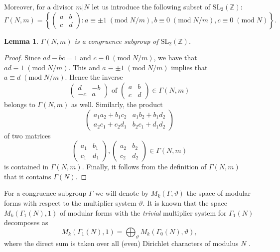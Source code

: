 \documentclass[11pt,a4paper]{amsart}
\newtheorem{lemma}[theorem]{Lemma}
\theoremstyle{definition}
\newcommand{\SZ}{\mathbb{Z}}                    %
\begin{document}
Moreover, for a divisor $m|N$ let us introduce the following subset of $\mathrm{SL_2}(\SZ)$:
\[  \Gamma(N,m) = \left\{ \begin{pmatrix} a & b \\ c & d \end{pmatrix}: a \equiv \pm 1 \;(\mathrm{mod}\;N/m), b \equiv 0 \;(\mathrm{mod}\;N/m), c \equiv 0 \;(\mathrm{mod}\;N) \right\}. \]
\begin{lemma} $\Gamma(N,m)$ is a congruence subgroup of $\mathrm{SL_2}(\SZ)$.
\end{lemma}
\begin{proof}
Since $ad-bc=1$ and $c\equiv 0  \;(\mathrm{mod}\;N/m)$, we have that $ad\equiv 1  \;(\mathrm{mod}\;N/m)$. This and $a \equiv \pm 1 \;(\mathrm{mod}\;N/m)$ implies that $a\equiv d  \;(\mathrm{mod}\;N/m)$. Hence the inverse
\[\begin{pmatrix} d & -b \\ -c & a \end{pmatrix} \textrm{ of } \begin{pmatrix} a & b \\ c & d \end{pmatrix} \in \Gamma(N,m)\]
belongs to $\Gamma(N,m)$ as well. Similarly, the product
\[ 
\begin{pmatrix} a_1a_2+b_1c_2 & a_1b_2+b_1d_2 \\ a_2c_1+c_2d_1 & b_2c_1+d_1d_2 \end{pmatrix}
\]
\textrm{ of two matrices }
\[\begin{pmatrix} a_1 & b_1 \\ c_1 & d_1 \end{pmatrix}, \begin{pmatrix} a_2 & b_2 \\ c_2 & d_2 \end{pmatrix} \in \Gamma(N,m) \]
is contained in $\Gamma(N,m)$. Finally, it follows from the definition of $\Gamma(N,m)$ that it contains $\Gamma(N)$.
\end{proof}
For a congruence subgroup $\Gamma$ we will denote by $ M_k(\Gamma, \vartheta)$ the space of modular forms with respect to the multiplier system $\vartheta$. It is known that the space $M_k(\Gamma_1(N), 1)$ of modular forms with the \emph{trivial} multiplier system for $\Gamma_1(N)$ decomposes as
\[ M_k(\Gamma_1(N), 1)= \bigoplus_{\vartheta} M_k(\Gamma_0(N), \vartheta), \]
where the direct sum is taken over all (even) Dirichlet characters of modulus $N$ \cite{serre1977modular}.


\end{document}
